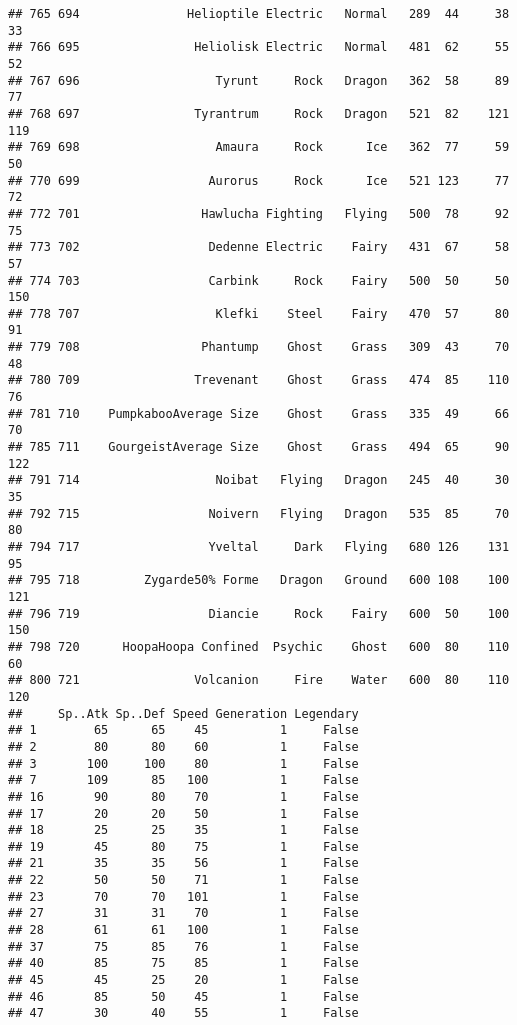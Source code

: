 \documentclass[
]{article}
\begin{document}
\begin{verbatim}
## 765 694               Helioptile Electric   Normal   289  44     38      33
## 766 695                Heliolisk Electric   Normal   481  62     55      52
## 767 696                   Tyrunt     Rock   Dragon   362  58     89      77
## 768 697                Tyrantrum     Rock   Dragon   521  82    121     119
## 769 698                   Amaura     Rock      Ice   362  77     59      50
## 770 699                  Aurorus     Rock      Ice   521 123     77      72
## 772 701                 Hawlucha Fighting   Flying   500  78     92      75
## 773 702                  Dedenne Electric    Fairy   431  67     58      57
## 774 703                  Carbink     Rock    Fairy   500  50     50     150
## 778 707                   Klefki    Steel    Fairy   470  57     80      91
## 779 708                 Phantump    Ghost    Grass   309  43     70      48
## 780 709                Trevenant    Ghost    Grass   474  85    110      76
## 781 710    PumpkabooAverage Size    Ghost    Grass   335  49     66      70
## 785 711    GourgeistAverage Size    Ghost    Grass   494  65     90     122
## 791 714                   Noibat   Flying   Dragon   245  40     30      35
## 792 715                  Noivern   Flying   Dragon   535  85     70      80
## 794 717                  Yveltal     Dark   Flying   680 126    131      95
## 795 718         Zygarde50% Forme   Dragon   Ground   600 108    100     121
## 796 719                  Diancie     Rock    Fairy   600  50    100     150
## 798 720      HoopaHoopa Confined  Psychic    Ghost   600  80    110      60
## 800 721                Volcanion     Fire    Water   600  80    110     120
##     Sp..Atk Sp..Def Speed Generation Legendary
## 1        65      65    45          1     False
## 2        80      80    60          1     False
## 3       100     100    80          1     False
## 7       109      85   100          1     False
## 16       90      80    70          1     False
## 17       20      20    50          1     False
## 18       25      25    35          1     False
## 19       45      80    75          1     False
## 21       35      35    56          1     False
## 22       50      50    71          1     False
## 23       70      70   101          1     False
## 27       31      31    70          1     False
## 28       61      61   100          1     False
## 37       75      85    76          1     False
## 40       85      75    85          1     False
## 45       45      25    20          1     False
## 46       85      50    45          1     False
## 47       30      40    55          1     False

\end{verbatim}
\end{document}
